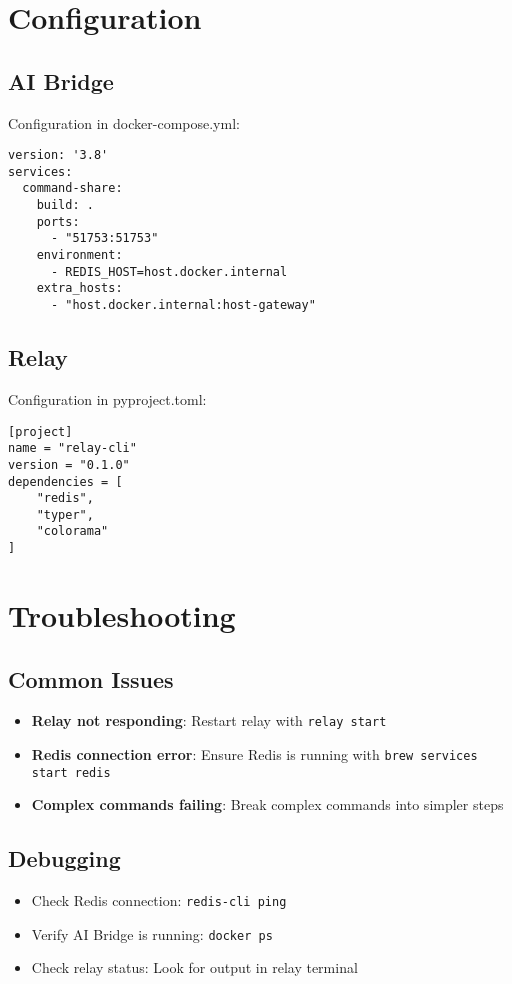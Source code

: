 \documentclass{article}
\begin{document}
\section{Configuration}

\subsection{AI Bridge}
Configuration in docker-compose.yml:
\begin{verbatim}
version: '3.8'
services:
  command-share:
    build: .
    ports:
      - "51753:51753"
    environment:
      - REDIS_HOST=host.docker.internal
    extra_hosts:
      - "host.docker.internal:host-gateway"
\end{verbatim}

\subsection{Relay}
Configuration in pyproject.toml:
\begin{verbatim}
[project]
name = "relay-cli"
version = "0.1.0"
dependencies = [
    "redis",
    "typer",
    "colorama"
]
\end{verbatim}

\section{Troubleshooting}

\subsection{Common Issues}
\begin{itemize}
    \item \textbf{Relay not responding}: Restart relay with \texttt{relay start}
    \item \textbf{Redis connection error}: Ensure Redis is running with \texttt{brew services start redis}
    \item \textbf{Complex commands failing}: Break complex commands into simpler steps
\end{itemize}

\subsection{Debugging}
\begin{itemize}
    \item Check Redis connection: \texttt{redis-cli ping}
    \item Verify AI Bridge is running: \texttt{docker ps}
    \item Check relay status: Look for output in relay terminal
\end{itemize}
\end{document}
